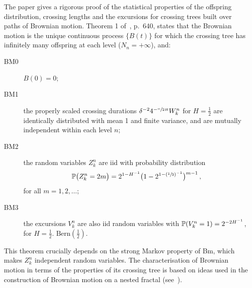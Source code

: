The paper \cite{ECP1673} gives a rigorous proof of the statistical properties of
the offspring distribution, crossing lengths and the excursions for crossing trees
built over paths of Brownian motion. Theorem 1 of~\cite{ECP1673}, p.~640, states
that the Brownian motion is the unique continuous process $\{B(t)\}$ for which the
crossing tree has infinitely many offspring at each level ($N_n = +\infty$), and:
\begin{description}
    \item[BM0] $B(0) = 0$;
    \item[BM1] the properly scaled crossing durations $\delta^{-2} 4^{-\sfrac{n}{2H}} W_k^n$
    for $H = \tfrac{1}{2}$ are identically distributed with mean 1 and finite variance,
    and are mutually independent within each level $n$;
    \item[BM2] the random variables $Z_k^n$ are iid with probability distribution
    \[ \mathbb{P}\bigl(Z_k^n=2m\bigr) = 2^{1-H^{-1}}\bigl(1-2^{1-(\sfrac{1}{2})^{-1}}\bigr)^{m-1} \,,\]
    for all $m=1,2,\ldots$;
    \item[BM3] the excursions $V_k^n$ are also iid random variables with 
    $\mathbb{P}( V_k^n = 1 ) = 2^{-2H^{-1}}$, for $H = \tfrac{1}{2}$.
    $\text{Bern}(\tfrac{1}{2})$.
\end{description}
This theorem crucially depends on the strong Markov property of Bm, which makes $Z_k^n$
independent random variables. The characterisation of Brownian motion in terms of
the properties of its crossing tree is based on ideas used in the construction of
Brownian motion on a nested fractal (see~\cite{BarlowPerkins88}).


